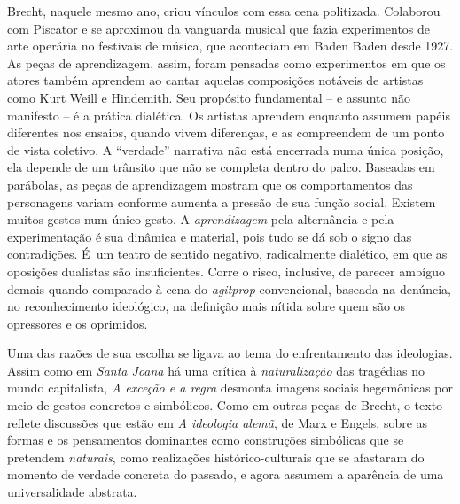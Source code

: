 Brecht, naquele mesmo ano, criou vínculos com essa cena politizada.
Colaborou com Piscator e se aproximou da vanguarda musical que fazia
experimentos de arte operária no festivais de música, que aconteciam em
Baden Baden desde 1927. As peças de aprendizagem, assim, foram
pensadas como experimentos em que os atores também aprendem ao cantar
aquelas composições notáveis de artistas como Kurt Weill e Hindemith.
Seu propósito fundamental -- e assunto não manifesto -- é a prática
dialética. Os artistas aprendem enquanto assumem papéis diferentes nos
ensaios, quando vivem diferenças, e as compreendem de um ponto de vista
coletivo. A “verdade” narrativa não está encerrada numa única posição,
ela depende de um trânsito que não se completa dentro do palco. Baseadas
em parábolas, as peças de aprendizagem mostram que os
comportamentos das personagens variam conforme aumenta a pressão de sua
função social. Existem muitos gestos num único gesto. A
{\it aprendizagem} pela alternância e pela experimentação é sua dinâmica
e material, pois tudo se dá sob o signo das contradições. É~um teatro de
sentido negativo, radicalmente dialético, em que as oposições dualistas
são insuficientes. Corre o risco, inclusive, de parecer ambíguo demais
quando comparado à cena do {\it agitprop} convencional, baseada na
denúncia, no reconhecimento ideológico, na definição mais nítida sobre
quem são os opressores e os oprimidos.

\subject{Estudo da peça: A exceção e a regra}


Uma das razões de sua escolha se ligava ao tema do enfrentamento das
ideologias. Assim como em {\it Santa Joana} há uma crítica à
{\it naturalização} das tragédias no mundo capitalista, {\it A exceção e
a regra} desmonta imagens sociais hegemônicas por meio de gestos
concretos e simbólicos. Como em outras peças de Brecht, o texto reflete
discussões que estão em {\it A ideologia alemã}, de Marx e Engels, sobre
as formas e os pensamentos dominantes como construções simbólicas que se
pretendem {\it naturais}, como realizações histórico-culturais que se
afastaram do momento de verdade concreta do passado, e agora assumem a
aparência de uma universalidade abstrata.

